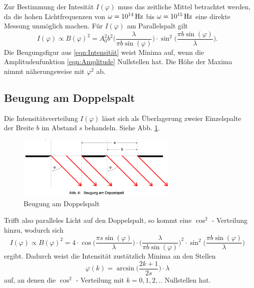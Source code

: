 Zur Bestimmung der Intesität $I(\varphi)$ muss das zeitliche Mittel betrachtet
werden, da die hohen Lichtfrequenzen von $\omega = 10^{14}\,\si{\hertz}$ bis $\omega = 10^{15}\,\si{\hertz}$
eine direkte Messung unmöglich machen. Für $I(\varphi)$ am Parallelspalt gilt
\begin{equation}
  I(\varphi) \propto B(\varphi)^2 = A_0^2b^2 \bigg(\frac{\lambda}{\pi b \sin{(\varphi)}}\bigg)
  \cdot \sin^2{\bigg(\frac{\pi b \sin{(\varphi)}}{\lambda}\bigg)}.
  \label{eqn:Intensität}
\end{equation}
Die Beugungsfigur aus \eqref{eqn:Intensität} weist Minima auf, wenn die
Amplitudenfunktion \eqref{eqn:Amplitude} Nullstellen hat. Die Höhe der Maxima
nimmt näherungsweise mit $\varphi^2$ ab.

\subsection{Beugung am Doppelspalt}
Die Intensitätsverteilung $I(\varphi)$ lässt sich als Überlagerung zweier
Einzelspalte der Breite $b$ im Abstand $s$ behandeln. Siehe Abb. \ref{fig:BeugungDoppel}.
\begin{figure}
  \centering
  \includegraphics[width=0.7\textwidth]{bilder/BeugungDoppel.png}
  \caption{Beugung am Doppelspalt \cite{406}}
  \label{fig:BeugungDoppel}
\end{figure}
Trifft also paralleles Licht auf den Doppelspalt, so kommt eine $\cos^2$ - Verteilung
hinzu, wodurch sich
\begin{equation}
  I(\varphi) \propto B(\varphi)^2= 4\cdot \cos{\bigg(\frac{\pi s \sin{(\varphi)}}{\lambda}\bigg)}
  \cdot \bigg(\frac{\lambda}{\pi b \sin{(\varphi)}}\bigg)^2 \cdot
  \sin^2{\bigg(\frac{\pi b \sin{(\varphi)}}{\lambda}\bigg)}
\end{equation}
ergibt. Dadurch weist die Intensität zustätzlich Minima an den Stellen
\begin{equation}
  \varphi(k) = \arcsin{\bigg(\frac{2k+1}{2s}\bigg)} \cdot \lambda
\end{equation}
auf, an denen die $\cos^2$ - Verteilung mit $k = 0, 1, 2, ..$ Nullstellen hat.


